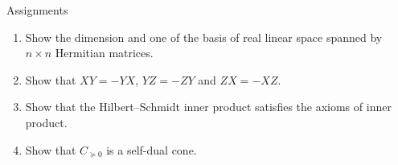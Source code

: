 \documentclass{beamer}
\begin{document}
\begin{frame}{Assignments}
\begin{enumerate}
\setlength{\itemsep}{2em}
\item Show the dimension and one of the basis of real linear space spanned by $n\times n$ Hermitian matrices.
\item Show that $XY=-YX$, $YZ=-ZY$ and $ZX=-XZ$.
\item Show that the Hilbert--Schmidt inner product satisfies the axioms of inner product.
\item Show that $C_{\succeq 0}$ is a self-dual cone.
\end{enumerate}
\end{frame}
\end{document}
